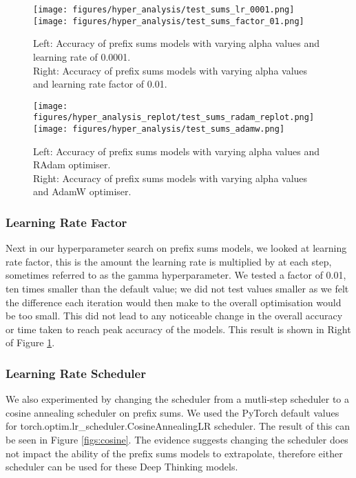 \begin{figure}[h]
    \texttt{[image: figures/hyper\_analysis/test\_sums\_lr\_0001.png]}\hfill
    \texttt{[image: figures/hyper\_analysis/test\_sums\_factor\_01.png]}
    \caption{
    Left: Accuracy of prefix sums models with varying alpha values and learning rate of 0.0001. \\
    Right: Accuracy of prefix sums models with varying alpha values and learning rate factor of 0.01.}
    \label{figs:lrandlrfac}
\end{figure}

\begin{figure}[h]
    \texttt{[image: figures/hyper\_analysis\_replot/test\_sums\_radam\_replot.png]}\hfill
    \texttt{[image: figures/hyper\_analysis/test\_sums\_adamw.png]}
    \caption{
    Left: Accuracy of prefix sums models with varying alpha values and RAdam optimiser. \\
    Right: Accuracy of prefix sums models with varying alpha values and AdamW optimiser.}
    \label{figs:adams}
\end{figure}

\subsubsection{Learning Rate Factor}
Next in our hyperparameter search on prefix sums models, we looked at learning rate factor, this is the amount the learning rate is multiplied by at each step, sometimes referred to as the gamma hyperparameter. We tested a factor of 0.01, ten times smaller than the default value; we did not test values smaller as we felt the difference each iteration would then make to the overall optimisation would be too small. This did not lead to any noticeable change in the overall accuracy or time taken to reach peak accuracy of the models. This result is shown in Right of Figure \ref{figs:lrandlrfac}.

\subsubsection{Learning Rate Scheduler}
We also experimented by changing the scheduler from a mutli-step scheduler to a cosine annealing scheduler on prefix sums. We used the PyTorch default values for torch.optim.lr\_scheduler.CosineAnnealingLR scheduler. The result of this can be seen in Figure \ref{figs:cosine}. The evidence suggests changing the scheduler does not impact the ability of the prefix sums models to extrapolate, therefore either scheduler can be used for these Deep Thinking models.

